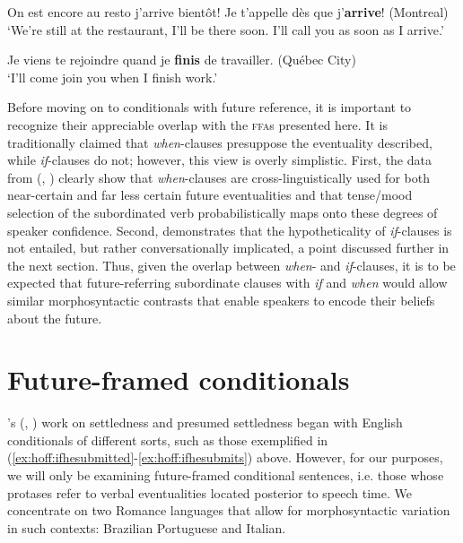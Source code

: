 \documentclass[output=paper,colorlinks,citecolor=brown]{langscibook}
\begin{document}
\begin{exe}
\ex\label{ex:hoff:desquej'arrive} On est encore au resto j’arrive bientôt! Je t’appelle dès que j’\textbf{arrive}! (Montreal)\\
`We’re still at the restaurant, I’ll be there soon. I’ll call you as soon as I arrive.'
\end{exe}

\begin{exe}
\ex\label{ex:hoff:quandjefinis} Je viens te rejoindre quand je \textbf{finis} de travailler. (Québec City)\\
`I’ll come join you when I finish work.'
\end{exe}

Before moving on to conditionals with future reference, it is important to recognize their appreciable overlap with the \textsc{ffa}s presented here. It is traditionally claimed that \textit{when}-clauses presuppose the eventuality described, while \textit{if}-clauses do not; however, this view is overly simplistic. First, the data from \citeauthor{Hoff2019} (\citeyear{Hoff2019}, \citeyear{Hoff2020}) clearly show that \textit{when}-clauses are cross-linguistically used for both near-certain and far less certain future eventualities and that tense/mood selection of the subordinated verb probabilistically maps onto these degrees of speaker confidence. Second, \citet{Schwenter1999} demonstrates that the hypotheticality of \textit{if}-clauses is not entailed, but rather conversationally implicated, a point discussed further in the next section. Thus, given the overlap between \textit{when}- and \textit{if}-clauses, it is to be expected that future-referring subordinate clauses with \textit{if} and \textit{when} would allow similar morphosyntactic contrasts that enable speakers to encode their beliefs about the future. 

\section{Future-framed conditionals}\label{sec:hoff:ffcs}

\citeauthor{Kaufmann2002}’s (\citeyear{Kaufmann2002}, \citeyear{Kaufmann2005}) work on settledness and presumed settledness began with English conditionals of different sorts, such as those exemplified in (\ref{ex:hoff:ifhesubmitted}-\ref{ex:hoff:ifhesubmits}) above. However, for our purposes, we will only be examining future-framed conditional sentences, i.e. those whose protases refer to verbal eventualities located posterior to speech time. We concentrate on two Romance languages that allow for morphosyntactic variation in such contexts: Brazilian Portuguese and Italian.
\end{document}
